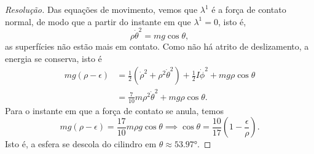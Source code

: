 \begin{proof}[Resolução]
    Das equações de movimento, vemos que \(\lambda^1\) é a força de contato normal, de modo que a partir do instante em que \(\lambda^1 = 0\), isto é,
    \begin{equation*}
        \rho \dot\theta^2 = mg\cos\theta,
    \end{equation*}
    as superfícies não estão mais em contato. Como não há atrito de deslizamento, a energia se conserva, isto é
    \begin{align*}
        mg(\rho - \epsilon) &= \frac12\left(\dot\rho^2+\rho^2\dot\theta^2\right) + \frac12I\dot\phi^2 + mg\rho\cos\theta\\
                             &= \frac7{10}m\rho^2\dot\theta^2 + mg\rho\cos\theta.
    \end{align*}
    Para o instante em que a força de contato se anula, temos
    \begin{equation*}
        mg(\rho - \epsilon) = \frac{17}{10} m\rho g \cos\theta \implies  \cos\theta = \frac{10}{17}\left(1 - \frac{\epsilon}{\rho}\right).
    \end{equation*}
    Isto é, a esfera se descola do cilindro em \(\theta \approx \ang{53.97}\).
\end{proof}

